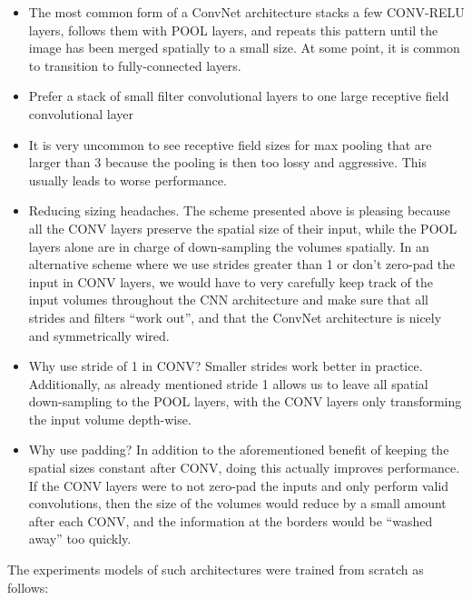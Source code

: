 \begin{itemize}
    \item The most common form of a ConvNet architecture stacks a few CONV-RELU layers, follows them with POOL layers, and repeats this pattern until the image has been merged spatially to a small size. At some point, it is common to transition to fully-connected layers.
    \item Prefer a stack of small filter convolutional layers to one large receptive field convolutional layer
    \item It is very uncommon to see receptive field sizes for max pooling that are larger than 3 because the pooling is then too lossy and aggressive. This usually leads to worse performance.
    \item Reducing sizing headaches. The scheme presented above is pleasing because all the CONV layers preserve the spatial size of their input, while the POOL layers alone are in charge of down-sampling the volumes spatially. In an alternative scheme where we use strides greater than 1 or don’t zero-pad the input in CONV layers, we would have to very carefully keep track of the input volumes throughout the CNN architecture and make sure that all strides and filters “work out”, and that the ConvNet architecture is nicely and symmetrically wired.
    \item Why use stride of 1 in CONV? Smaller strides work better in practice. Additionally, as already mentioned stride 1 allows us to leave all spatial down-sampling to the POOL layers, with the CONV layers only transforming the input volume depth-wise.
    \item Why use padding? In addition to the aforementioned benefit of keeping the spatial sizes constant after CONV, doing this actually improves performance. If the CONV layers were to not zero-pad the inputs and only perform valid convolutions, then the size of the volumes would reduce by a small amount after each CONV, and the information at the borders would be “washed away” too quickly.
\end{itemize}

The experiments models of such architectures were trained from scratch as follows:

